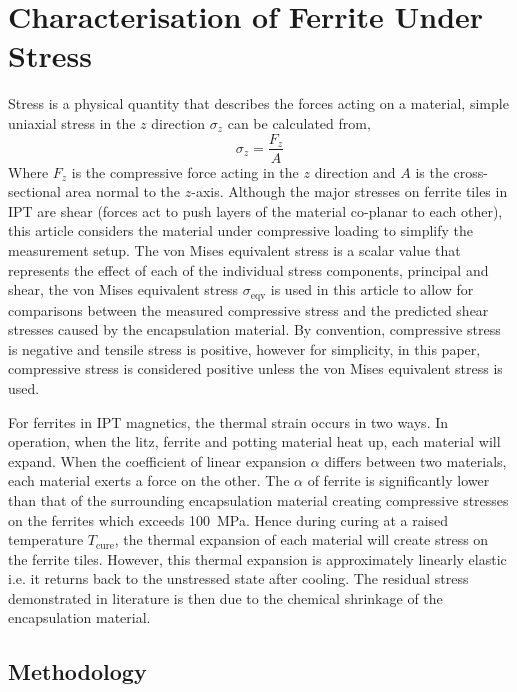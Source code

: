 \documentclass[conference]{IEEEtran}
\begin{document}
\section{Characterisation of Ferrite Under Stress}
Stress is a physical quantity that describes the forces acting on a material, simple uniaxial stress in the $z$ direction $\sigma_z$ can be calculated from, 
\begin{equation}
  \sigma_z = \frac{F_z}{A}
  \label{eqn:uniaxialstress}
\end{equation}
Where $F_z$ is the compressive force acting in the $z$ direction and $A$ is the cross-sectional area normal to the $z$-axis. 
Although the major stresses on ferrite tiles in IPT are shear (forces act to push layers of the material co-planar to each other), this article considers the material under compressive loading to simplify the measurement setup. 
The von Mises equivalent stress is a scalar value that represents the effect of each of the individual stress components, principal and shear, the von Mises equivalent stress $\sigma_\text{eqv}$ is used in this article to allow for comparisons between the measured compressive stress and the predicted shear stresses caused by the encapsulation material. 
By convention, compressive stress is negative and tensile stress is positive, however for simplicity, in this paper, compressive stress is considered positive unless the von Mises equivalent stress is used. 

For ferrites in IPT magnetics, the thermal strain occurs in two ways.
In operation, when the litz, ferrite and potting material heat up, each material will expand. 
When the coefficient of linear expansion $\alpha$ differs between two materials, each material exerts a force on the other. 
The $\alpha$ of ferrite is significantly lower than that of the surrounding encapsulation material creating compressive stresses on the ferrites which exceeds \SI{100}{\mega\pascal}. 
Hence during curing at a raised temperature $T_\text{cure}$, the thermal expansion of each material will create stress on the ferrite tiles. 
However, this thermal expansion is approximately linearly elastic i.e. it returns back to the unstressed state after cooling. 
The residual stress demonstrated in literature is then due to the chemical shrinkage of the encapsulation material. 

\subsection{Methodology}
\end{document}

